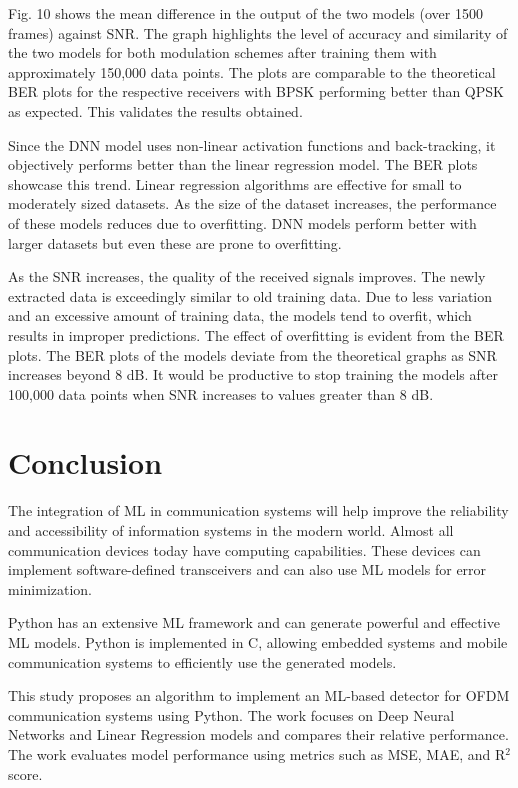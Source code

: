 \documentclass[conference]{IEEEtran}
\begin{document}
Fig. 10 shows the mean difference in the output of the two models (over 1500 frames) against SNR. The graph highlights the level of accuracy and similarity of the two models for both modulation schemes after training them with approximately 150,000 data points. The plots are comparable to the theoretical BER plots for the respective receivers with BPSK performing better than QPSK as expected. This validates the results obtained.

Since the DNN model uses non-linear activation functions and back-tracking, it objectively performs better than the linear regression model. The BER plots showcase this trend. Linear regression algorithms are effective for small to moderately sized datasets. As the size of the dataset increases, the performance of these models reduces due to overfitting. DNN models perform better with larger datasets but even these are prone to overfitting.

As the SNR increases, the quality of the received signals improves. The newly extracted data is exceedingly similar to old training data. Due to less variation and an excessive amount of training data, the models tend to overfit, which results in improper predictions. The effect of overfitting is evident from the BER plots. The BER plots of the models deviate from the theoretical graphs as SNR increases beyond 8 dB. It would be productive to stop training the models after 100,000 data points when SNR increases to values greater than 8 dB.

\section{Conclusion}
The integration of ML in communication systems will help improve the reliability and accessibility of information systems in the modern world. Almost all communication devices today have computing capabilities. These devices can implement software-defined transceivers and can also use ML models for error minimization. 

Python has an extensive ML framework and can generate powerful and effective ML models. Python is implemented in C, allowing embedded systems and mobile communication systems to efficiently use the generated models.

This study proposes an algorithm to implement an ML-based detector for OFDM communication systems using Python. The work focuses on Deep Neural Networks and Linear Regression models and compares their relative performance. The work evaluates model performance using metrics such as MSE, MAE, and R$^{2}$ score. 
\end{document}
